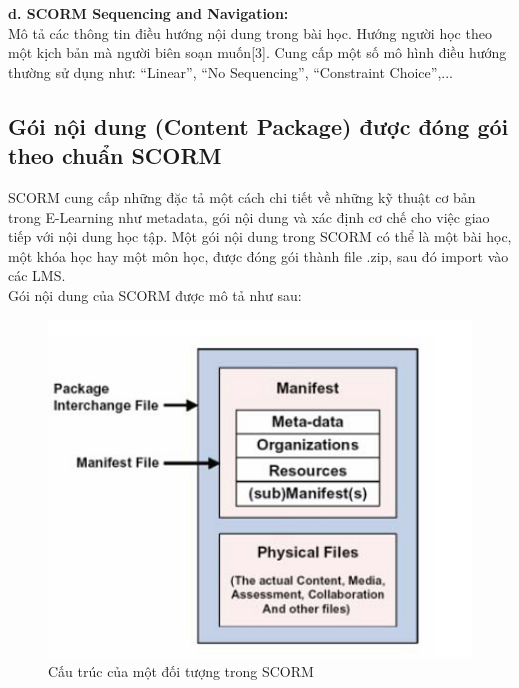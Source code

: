 	\vspace{0.5cm}
	
	\textbf{d. SCORM Sequencing and Navigation:}\\	
	Mô tả các thông tin điều hướng nội dung trong bài học. Hướng người học theo một kịch bản mà người biên soạn muốn[3]. Cung cấp một số mô hình điều hướng thường sử dụng như: “Linear”, “No Sequencing”, “Constraint Choice”,...	
	
	

\newpage

\subsection{Gói nội dung (Content Package) được đóng gói theo chuẩn SCORM}

	SCORM cung cấp những đặc tả một cách chi tiết về những kỹ thuật cơ bản trong E-Learning như metadata, gói nội dung và xác định cơ chế cho việc giao tiếp với nội dung học tập. Một gói nội dung trong SCORM có thể là một bài học, một khóa học hay một môn học, được đóng gói thành file .zip, sau đó import vào các LMS.\\

	Gói nội dung của SCORM được mô tả như sau:\\

\begin{center}
	\begin{figure}[htp]
		\begin{center}
			\includegraphics[width=16cm]{Chapter2/Pictures/picture23.png}
		\end{center}
		\caption{Cấu trúc của một đối tượng trong SCORM}
		\label{refpicture23}
	\end{figure}
\end{center}

